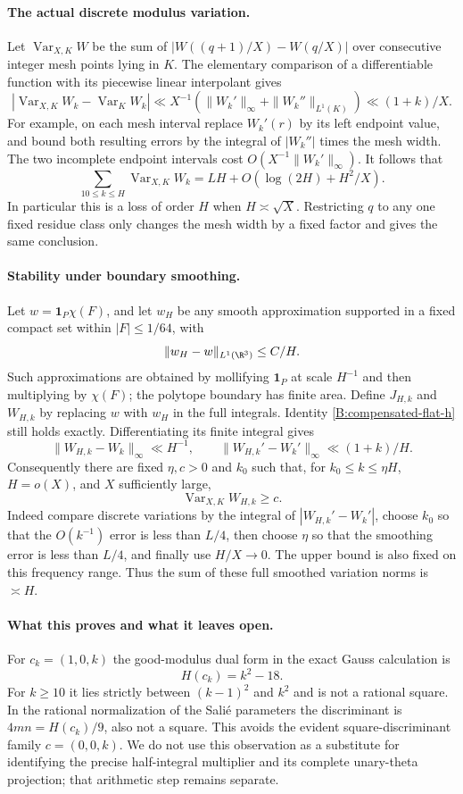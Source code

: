 \paragraph{The actual discrete modulus variation.}
Let $\operatorname{Var}_{X,K} W$ be the sum of
$|W((q+1)/X)-W(q/X)|$ over consecutive integer mesh points lying in
$K$.  The elementary comparison of a differentiable function with its
piecewise linear interpolant gives
\[
 \left|\operatorname{Var}_{X,K}W_k-
                  \operatorname{Var}_K W_k\right|
 \ll X^{-1}(\|W_k'\|_\infty+\|W_k''\|_{L^1(K)})
 \ll (1+k)/X.
\]
For example, on each mesh interval replace $W_k'(r)$ by its left
endpoint value, and bound both resulting errors by the integral of
$|W_k''|$ times the mesh width.  The two incomplete endpoint intervals
cost $O(X^{-1}\|W_k'\|_\infty)$.
It follows that
\[
 \sum_{10\leq k\leq H}\operatorname{Var}_{X,K}W_k
       =LH+O(\log(2H)+H^2/X).
\]
In particular this is a loss of order $H$ when $H\asymp\sqrt X$.
Restricting $q$ to any one fixed residue class only changes the mesh
width by a fixed factor and gives the same conclusion.

\paragraph{Stability under boundary smoothing.}
Let $w=\mathbf1_P\chi(F)$, and let $w_H$ be any smooth approximation
supported in a fixed compact set within $|F|\leq1/64$, with
\[
 \|w_H-w\|_{L^1(\R^3)}\leq C/H.
\]
Such approximations are obtained by mollifying $\mathbf1_P$ at scale
$H^{-1}$ and then multiplying by $\chi(F)$; the polytope boundary has
finite area.  Define $J_{H,k}$ and $W_{H,k}$ by replacing $w$ with
$w_H$ in the full integrals.  Identity
\eqref{B:compensated-flat-h} still holds exactly.  Differentiating its
finite integral gives
\[
 \|W_{H,k}-W_k\|_\infty\ll H^{-1},\qquad
 \|W_{H,k}'-W_k'\|_\infty\ll(1+k)/H.
\]
Consequently there are fixed $\eta,c>0$ and $k_0$ such that, for
$k_0\leq k\leq\eta H$, $H=o(X)$, and $X$ sufficiently large,
\[
 \operatorname{Var}_{X,K}W_{H,k}\geq c.
\]
Indeed compare discrete variations by the integral of
$|W_{H,k}'-W_k'|$, choose $k_0$ so that the $O(k^{-1})$ error is
less than $L/4$, then choose $\eta$ so that the smoothing error is
less than $L/4$, and finally use $H/X\to0$.  The upper bound is
also fixed on this frequency range.  Thus the sum of these full
smoothed variation norms is $\asymp H$.

\paragraph{What this proves and what it leaves open.}
For $c_k=(1,0,k)$ the good-modulus dual form in the exact Gauss
calculation is
\[
 H(c_k)=k^2-18.
\]
For $k\geq10$ it lies strictly between $(k-1)^2$ and $k^2$ and is
not a rational square.  In the rational normalization of the Sali\'e
parameters the discriminant is $4mn=H(c_k)/9$, also not a square.
This avoids the evident square-discriminant family $c=(0,0,k)$.
We do not use this observation as a substitute for identifying the
precise half-integral multiplier and its complete unary-theta
projection; that arithmetic step remains separate.

